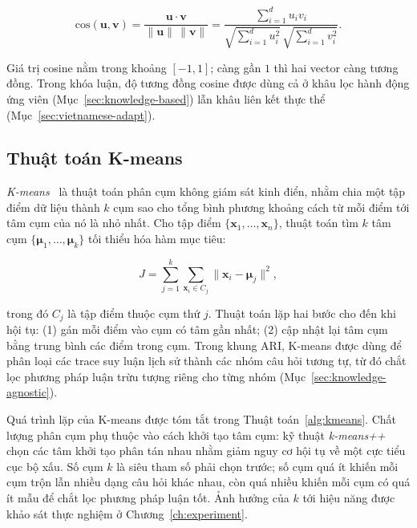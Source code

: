 \begin{equation}
\label{eq:cosine}
\mathrm{cos}(\mathbf{u}, \mathbf{v}) =
\frac{\mathbf{u} \cdot \mathbf{v}}{\lVert \mathbf{u} \rVert \, \lVert \mathbf{v} \rVert}
= \frac{\sum_{i=1}^{d} u_i v_i}{\sqrt{\sum_{i=1}^{d} u_i^2} \, \sqrt{\sum_{i=1}^{d} v_i^2}}.
\end{equation}

Giá trị cosine nằm trong khoảng $[-1, 1]$; càng gần $1$ thì hai vector càng tương đồng. Trong khóa
luận, độ tương đồng cosine được dùng cả ở khâu lọc hành động ứng viên (Mục~\ref{sec:knowledge-based})
lẫn khâu liên kết thực thể (Mục~\ref{sec:vietnamese-adapt}).

\subsection{Thuật toán K-means}

\textit{K-means}~\cite{macqueen1967kmeans} là thuật toán phân cụm không giám sát kinh điển, nhằm
chia một tập điểm dữ liệu thành $k$ cụm sao cho tổng bình phương khoảng cách từ mỗi điểm tới tâm
cụm của nó là nhỏ nhất. Cho tập điểm $\{\mathbf{x}_1, \dots, \mathbf{x}_n\}$, thuật toán tìm $k$
tâm cụm $\{\boldsymbol{\mu}_1, \dots, \boldsymbol{\mu}_k\}$ tối thiểu hóa hàm mục tiêu:

\begin{equation}
\label{eq:kmeans}
J = \sum_{j=1}^{k} \sum_{\mathbf{x}_i \in C_j} \lVert \mathbf{x}_i - \boldsymbol{\mu}_j \rVert^2,
\end{equation}

trong đó $C_j$ là tập điểm thuộc cụm thứ $j$. Thuật toán lặp hai bước cho đến khi hội tụ: (1) gán
mỗi điểm vào cụm có tâm gần nhất; (2) cập nhật lại tâm cụm bằng trung bình các điểm trong cụm.
Trong khung ARI, K-means được dùng để phân loại các trace suy luận lịch sử thành các nhóm câu hỏi
tương tự, từ đó chắt lọc phương pháp luận trừu tượng riêng cho từng nhóm (Mục~\ref{sec:knowledge-agnostic}).

Quá trình lặp của K-means được tóm tắt trong Thuật toán~\ref{alg:kmeans}. Chất lượng phân cụm phụ
thuộc vào cách khởi tạo tâm cụm: kỹ thuật \textit{k-means++} chọn các tâm khởi tạo phân tán nhau
nhằm giảm nguy cơ hội tụ về một cực tiểu cục bộ xấu. Số cụm $k$ là siêu tham số phải chọn trước; số
cụm quá ít khiến mỗi cụm trộn lẫn nhiều dạng câu hỏi khác nhau, còn quá nhiều khiến mỗi cụm có quá
ít mẫu để chắt lọc phương pháp luận tốt. Ảnh hưởng của $k$ tới hiệu năng được khảo sát thực nghiệm
ở Chương~\ref{ch:experiment}.

